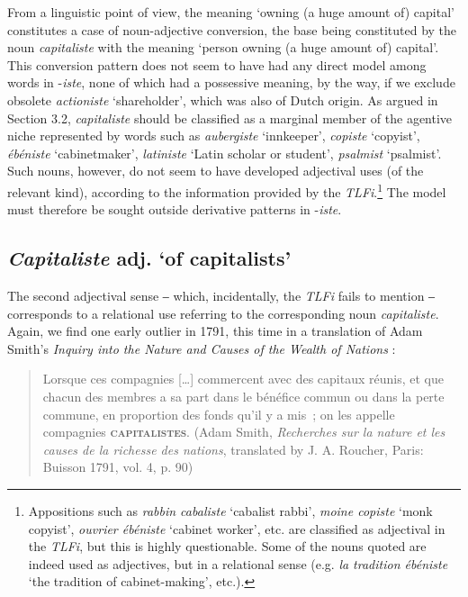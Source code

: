 \documentclass[output=paper]{langsci/langscibook}
\begin{document}
From a linguistic point of view, the meaning `owning (a huge amount of)
capital' constitutes a case of noun-adjective conversion, the base being
constituted by the noun \emph{capitaliste} with the meaning `person
owning (a huge amount of) capital'. This conversion pattern does not
seem to have had any direct model among words in -\emph{iste}, none of
which had a possessive meaning, by the way, if we exclude obsolete
\emph{actioniste} `shareholder', which was also of Dutch origin. As
argued in Section 3.2, \emph{capitaliste} should be classified as a
marginal member of the agentive niche represented by words such as
\emph{aubergiste} `innkeeper', \emph{copiste} `copyist', \emph{ébéniste}
`cabinetmaker', \emph{latiniste} `Latin scholar or student',
\emph{psalmist} `psalmist'. Such nouns, however, do not seem to
have developed adjectival uses (of the relevant kind), according to the
information provided by the \emph{TLFi}.\footnote{Appositions such as
  \emph{rabbin cabaliste} `cabalist rabbi', \emph{moine copiste} `monk
  copyist', \emph{ouvrier ébéniste} `cabinet worker', etc. are
  classified as adjectival in the \emph{TLFi}, but this is highly
  questionable. Some of the nouns quoted are indeed used as adjectives,
  but in a relational sense (e.g. \emph{la tradition ébéniste} `the
  tradition of cabinet-making', etc.).} The model must therefore be
sought outside derivative patterns in -\emph{iste}.

\subsection{\emph{Capitaliste} adj. `of capitalists'}

The second adjectival sense ‒ which, incidentally, the \emph{TLFi} fails
to mention ‒ corresponds to a relational use referring to the
corresponding noun \emph{capitaliste}. Again, we find one early outlier
in 1791, this time in a translation of Adam Smith's \emph{Inquiry into
the Nature and Causes of the Wealth of Nations} :

\begin{quote}
Lorsque ces compagnies {[}\ldots{}{]} commercent avec des capitaux
réunis, et que chacun des membres a sa part dans le bénéfice commun ou
dans la perte commune, en proportion des fonds qu'il y a mis~; on les
appelle compagnies \textbf{\textsc{capitalistes}}.
(Adam Smith, \emph{Recherches sur la
nature et les causes de la richesse des nations}, translated by J. A.
Roucher, Paris: Buisson 1791, vol. 4, p. 90)
\end{quote}
\end{document}
